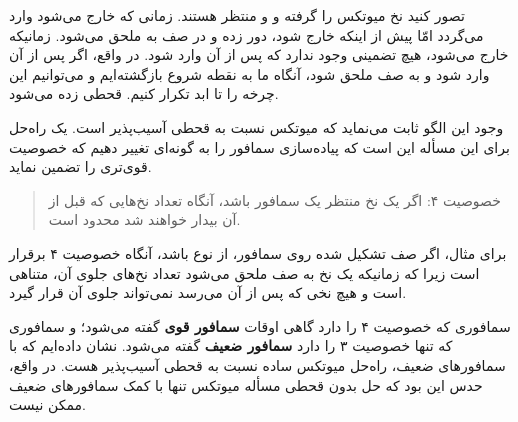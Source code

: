 \documentclass{book}
\begin{document}
    تصور کنید نخ  میوتکس را گرفته و  و  منتظر هستند. 
    زمانی که  خارج می‌شود  وارد می‌گردد امّا پیش از اینکه   خارج شود،   دور زده و در صف به   ملحق می‌شود. 
    زمانیکه   خارج می‌شود، هیچ تضمینی وجود ندارد که  پس از آن   وارد شود. در واقع، اگر پس از آن  وارد شود و   
    به صف ملحق شود، آنگاه ما به نقطه  شروع بازگشته‌ایم و می‌توانیم این چرخه را تا ابد تکرار کنیم.  قحطی زده می‌شود. 

    وجود این الگو ثابت می‌نماید که میوتکس نسبت به قحطی آسیب‌پذیر است. 
    یک راه‌حل برای این مسأله این است که پیاده‌سازی سمافور را به گونه‌ای تغییر دهیم که خصوصیت قوی‌تری را تضمین نماید. 

\begin{quote}
    خصوصیت ۴: اگر یک نخ منتظر یک سمافور باشد، آنگاه تعداد نخ‌هایی که قبل از آن بیدار خواهند شد محدود است. 
\end{quote}

    برای مثال، اگر صف تشکیل شده روی سمافور، از نوع   باشد،
    آنگاه خصوصیت ۴ برقرار است زیرا که زمانیکه یک نخ به صف ملحق می‌شود تعداد نخ‌های جلوی آن، متناهی است و هیچ نخی که پس از آن می‌رسد 
    نمی‌تواند جلوی آن قرار گیرد. 

    سمافوری که خصوصیت ۴ را دارد گاهی اوقات \textbf{سمافور قوی} گفته می‌شود؛ و 
    سمافوری که تنها خصوصیت ۳ را دارد \textbf{سمافور ضعیف} گفته می‌شود.
    نشان‌ داده‌ایم که  با سمافورهای ضعیف، راه‌حل میوتکس ساده نسبت به قحطی آسیب‌پذیر هست.
    در واقع، حدس  این بود که حل بدون قحطی مسأله میوتکس تنها با کمک سمافورهای ضعیف ممکن نیست. 
\end{document}
